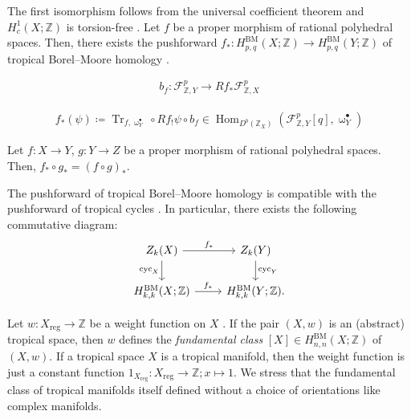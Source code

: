 \documentclass[a4paper,dvipdfmx,reqno,12pt]{amsart}
\theoremstyle{definition}
\newcommand{\deq}{\coloneqq}
\newcommand{\opn}[1]{\operatorname{#1}}
\numberwithin{equation}{section}
\begin{document}
The first isomorphism follows from the universal 
coefficient theorem and 
$H^{1}_c(X;\mathbb{Z})$ is torsion-free 
\cite[VI.Proposition 5.3]{iversenCohomologySheaves1986a}.
Let $f$ be a proper morphism of rational polyhedral 
spaces.
Then, there exists the pushforward
$f_*\colon H_{p,q}^{\mathrm{BM}}(X;\mathbb{Z})
\to H_{p,q}^{\mathrm{BM}}(Y;\mathbb{Z})$
of tropical Borel--Moore homology 
\cite[Definition 4.9]{gross2019sheaftheoretic}.

\begin{align}
b_f\colon \mathcal{F}^{p}_{\mathbb{Z},Y}\to 
Rf_*\mathcal{F}^{p}_{\mathbb{Z},X}
\end{align}

\begin{align}
f_*(\psi)\deq \opn{Tr}_{f,\upomega_Y^{\bullet}}\circ 
Rf_!\psi \circ b_{f}\in 
\opn{Hom}_{D^{b}(\mathbb{Z}_X)}(
\mathcal{F}^{p}_{\mathbb{Z},Y}[q],\upomega_Y^{\bullet})
\end{align}

Let $f\colon X\to Y$, $g\colon Y\to Z$ be a proper 
morphism of rational polyhedral spaces.
Then, $f_*\circ g_*=(f\circ g)_*$.

The pushforward of tropical Borel--Moore homology
is compatible with the pushforward of tropical cycles
\cite[Definition 3.6]{gross2019sheaftheoretic}.
In particular, there exists the following commutative 
diagram:
\begin{equation}
\begin{tikzcd}
 Z_k(X) \arrow[r,"{f_*}"] \arrow[d,"{\opn{cyc}_X}"']
 & Z_{k}(Y) \arrow[d,"{\opn{cyc}_Y}"] \\
 H_{k,k}^{\mathrm{BM}}(X;\mathbb{Z}) 
\arrow[r,"f_*"]
 & H_{k,k}^{\mathrm{BM}}(Y;\mathbb{Z}).
\end{tikzcd}
\end{equation}



Let $w\colon X_{\mathrm{reg}}\to \mathbb{Z}$ be 
a weight function on $X$ \cite[Definition 4.8]{MR3894860}.
If the pair $(X,w)$ is an (abstract) tropical space, 
then $w$ defines the \emph{fundamental class} 
$[X]\in H_{n,n}^{\mathrm{BM}}(X;\mathbb{Z})$ of 
$(X,w)$.
If a tropical space $X$ is a tropical manifold, 
then the weight function is just a constant 
function $1_{X_{\mathrm{reg}}}\colon X_{\opn{reg}}\to \mathbb{Z};
x\mapsto 1$.
We stress that the fundamental class of tropical 
manifolds itself defined without 
a choice of orientations like complex manifolds.
\end{document}
